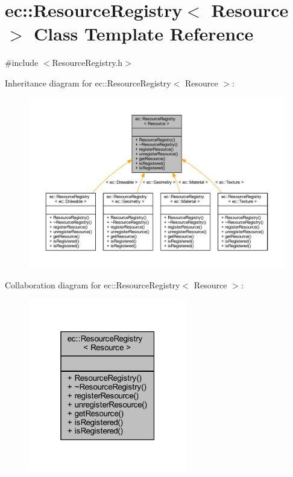 \hypertarget{classec_1_1_resource_registry}{}\section{ec\+:\+:Resource\+Registry$<$ Resource $>$ Class Template Reference}
\label{classec_1_1_resource_registry}


{\ttfamily \#include $<$Resource\+Registry.\+h$>$}



Inheritance diagram for ec\+:\+:Resource\+Registry$<$ Resource $>$\+:\nopagebreak
\begin{figure}[H]
\begin{center}
\leavevmode
\includegraphics[width=350pt]{classec_1_1_resource_registry__inherit__graph}
\end{center}
\end{figure}


Collaboration diagram for ec\+:\+:Resource\+Registry$<$ Resource $>$\+:\nopagebreak
\begin{figure}[H]
\begin{center}
\leavevmode
\includegraphics[width=196pt]{classec_1_1_resource_registry__coll__graph}
\end{center}
\end{figure}
